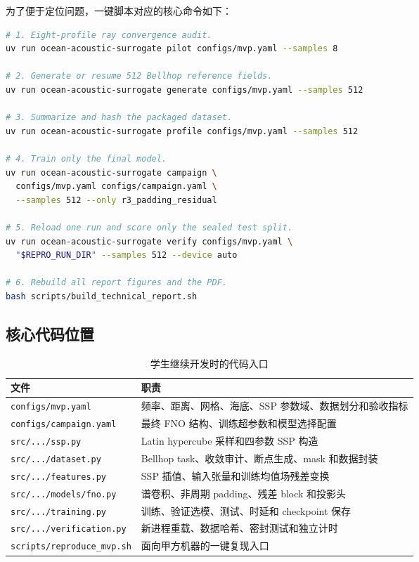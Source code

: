 \documentclass[UTF8,11pt]{ctexart}
\begin{document}
为了便于定位问题，一键脚本对应的核心命令如下：

\begin{lstlisting}[style=repro,language=bash]
# 1. Eight-profile ray convergence audit.
uv run ocean-acoustic-surrogate pilot configs/mvp.yaml --samples 8

# 2. Generate or resume 512 Bellhop reference fields.
uv run ocean-acoustic-surrogate generate configs/mvp.yaml --samples 512

# 3. Summarize and hash the packaged dataset.
uv run ocean-acoustic-surrogate profile configs/mvp.yaml --samples 512

# 4. Train only the final model.
uv run ocean-acoustic-surrogate campaign \
  configs/mvp.yaml configs/campaign.yaml \
  --samples 512 --only r3_padding_residual

# 5. Reload one run and score only the sealed test split.
uv run ocean-acoustic-surrogate verify configs/mvp.yaml \
  "$REPRO_RUN_DIR" --samples 512 --device auto

# 6. Rebuild all report figures and the PDF.
bash scripts/build_technical_report.sh
\end{lstlisting}

\subsection{核心代码位置}

\begin{table}[H]
\centering
\caption{学生继续开发时的代码入口}
\begin{tabularx}{\textwidth}{L{5.2cm}Y}
\toprule
文件 & 职责 \\
\midrule
\texttt{configs/mvp.yaml} & 频率、距离、网格、海底、SSP 参数域、数据划分和验收指标 \\
\texttt{configs/campaign.yaml} & 最终 FNO 结构、训练超参数和模型选择配置 \\
\texttt{src/.../ssp.py} & Latin hypercube 采样和四参数 SSP 构造 \\
\texttt{src/.../dataset.py} & Bellhop task、收敛审计、断点生成、mask 和数据封装 \\
\texttt{src/.../features.py} & SSP 插值、输入张量和训练均值场残差变换 \\
\texttt{src/.../models/fno.py} & 谱卷积、非周期 padding、残差 block 和投影头 \\
\texttt{src/.../training.py} & 训练、验证选模、测试、时延和 checkpoint 保存 \\
\texttt{src/.../verification.py} & 新进程重载、数据哈希、密封测试和独立计时 \\
\texttt{scripts/reproduce\_mvp.sh} & 面向甲方机器的一键复现入口 \\
\bottomrule
\end{tabularx}
\end{table}
\end{document}

